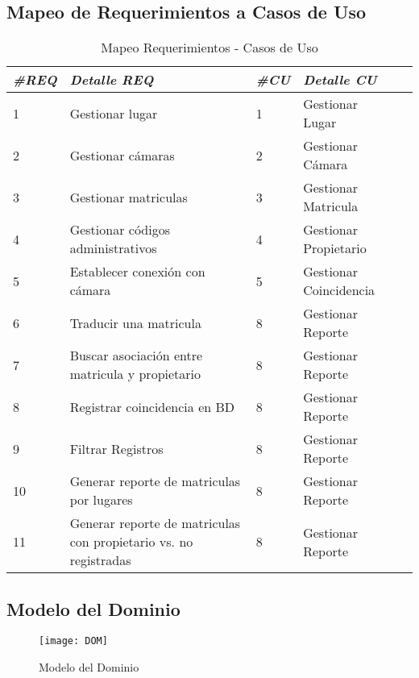\begin{landscape}
    \section{Mapeo de Requerimientos a Casos de Uso}
    
    \begin{table}[H]
        \centering
        \begin{tabular}{@{} *5l @{}} \toprule
        \emph{\#REQ} & \emph{Detalle REQ} & \emph{\#CU} & \emph{Detalle CU} \\ \midrule
         1 & Gestionar lugar & 1 & Gestionar Lugar \\ 
         2 & Gestionar cámaras & 2 & Gestionar Cámara \\ 
         3 & Gestionar matriculas & 3 & Gestionar Matricula \\ 
         4 & Gestionar códigos administrativos & 4 & Gestionar Propietario \\ 
         5 & Establecer conexión con cámara & 5 & Gestionar Coincidencia \\ 
         6 & Traducir una matricula & 8 & Gestionar Reporte \\ 
         7 & Buscar asociación entre matricula y propietario & 8 & Gestionar Reporte \\ 
         8 & Registrar coincidencia en BD & 8 & Gestionar Reporte \\ 
         9 & Filtrar Registros & 8 & Gestionar Reporte \\ 
         10 & Generar reporte de matriculas por lugares & 8 & Gestionar Reporte \\ 
         11 & Generar reporte de matriculas con propietario vs. no registradas & 8 & Gestionar Reporte \\  \bottomrule
         \hline
        \end{tabular}
            \caption{Mapeo Requerimientos - Casos de Uso}
            \label{tab:tab-mapeo}
    \end{table}
    
\end{landscape}

\begin{landscape}
\section{Modelo del Dominio}
    \begin{figure}[H]
        \centering
        \texttt{[image: DOM]}
        \caption{Modelo del Dominio}
        \label{fig:DOM}
    \end{figure}
    
\end{landscape}

